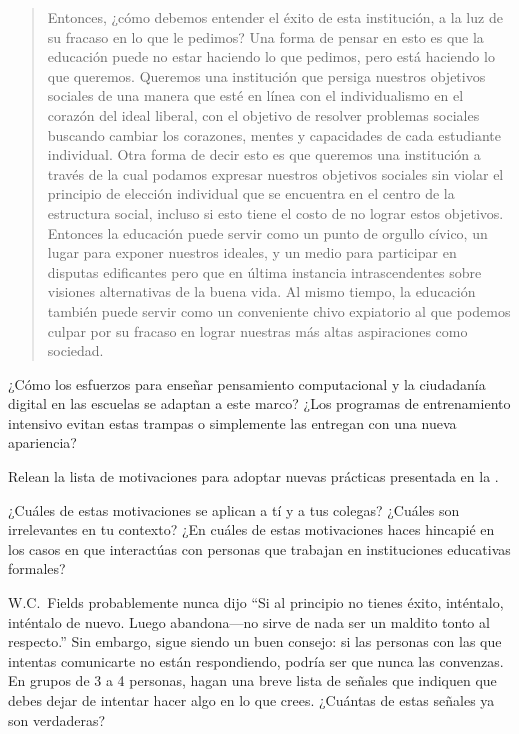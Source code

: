 \begin{quote}

Entonces, ¿cómo debemos entender el éxito de esta institución,
a la luz de su fracaso en lo que le pedimos?
Una forma de pensar en esto es que
la educación puede no estar haciendo lo que pedimos,
pero está haciendo lo que queremos.
Queremos una institución que persiga nuestros objetivos sociales
de una manera que esté en línea con el individualismo en el corazón del ideal liberal,
con el objetivo de resolver problemas sociales
buscando cambiar los corazones, mentes y capacidades de cada estudiante individual.
Otra forma de decir esto es que
queremos una institución a través de la cual podamos expresar nuestros objetivos sociales
sin violar el principio de elección individual
que se encuentra en el centro de la estructura social,
incluso si esto tiene el costo de no lograr estos objetivos.
Entonces la educación puede servir como un punto de orgullo cívico,
un lugar para exponer nuestros ideales,
y un medio para participar en disputas edificantes pero  
que en última instancia intrascendentes
sobre visiones alternativas de la buena vida.
Al mismo tiempo,
la educación también puede servir como un conveniente chivo expiatorio
al que podemos culpar por su fracaso en lograr nuestras más altas aspiraciones como sociedad.

\end{quote}

¿Cómo los esfuerzos para enseñar pensamiento computacional y la ciudadanía digital en las escuelas se adaptan a este marco?
¿Los programas de entrenamiento intensivo evitan estas trampas o simplemente las entregan con una nueva apariencia?


Relean la lista de motivaciones para adoptar nuevas prácticas
presentada en la .

¿Cuáles de estas motivaciones se aplican a tí y a tus colegas?
¿Cuáles son irrelevantes en tu contexto?
¿En cuáles de estas motivaciones haces hincapié
en los casos en que interactúas con personas que trabajan en instituciones educativas formales?



W.C.~Fields probablemente nunca dijo
``Si al principio no tienes éxito, inténtalo, inténtalo de nuevo.
Luego abandona---no sirve de nada ser un maldito tonto al respecto.''
Sin embargo, sigue siendo un buen consejo:
si las personas con las que intentas comunicarte no están respondiendo,
podría ser que nunca las convenzas.
En grupos de 3 a 4 personas,
hagan una breve lista de señales que indiquen que debes dejar de intentar hacer algo en lo que crees.
¿Cuántas de estas señales ya son verdaderas?

